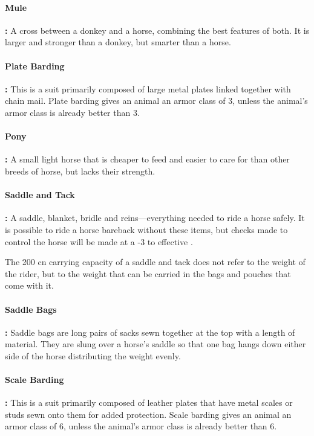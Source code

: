 \begin{multicols*}{2}
\paragraph{Mule}\textbf{:} A cross between a donkey and a horse, combining the best features of both. It is larger and stronger than a donkey, but smarter than a horse.

\paragraph{Plate Barding}\textbf{:} This is a suit primarily composed of large metal plates linked together with chain mail. Plate barding gives an animal an armor class of 3, unless the animal’s armor class is already better than 3.

\paragraph{Pony}\textbf{:} A small light horse that is cheaper to feed and easier to care for than other breeds of horse, but lacks their strength.

\paragraph{Saddle and Tack}\textbf{:} A saddle, blanket, bridle and reins—everything needed to ride a horse safely. It is possible to ride a horse bareback without these items, but  checks made to control the horse will be made at a -3 to effective .

The 200 cn carrying capacity of a saddle and tack does not refer to the weight of the rider, but to the weight that can be carried in the bags and pouches that come with it.

\paragraph{Saddle Bags}\textbf{:} Saddle bags are long pairs of sacks sewn together at the top with a length of material. They are slung over a horse’s saddle so that one bag hangs down either side of the horse distributing the weight evenly.

\paragraph{Scale Barding}\textbf{:} This is a suit primarily composed of leather plates that have metal scales or studs sewn onto them for added protection. Scale barding gives an animal an armor class of 6, unless the animal’s armor class is already better than 6.


\end{multicols*}

